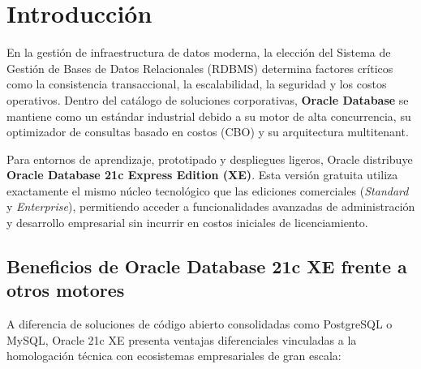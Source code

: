 \section{Introducción}
    
    En la gestión de infraestructura de datos moderna, la elección del Sistema de Gestión de Bases de Datos Relacionales (RDBMS) determina factores críticos como la consistencia transaccional, la escalabilidad, la seguridad y los costos operativos. Dentro del catálogo de soluciones corporativas, \textbf{Oracle Database} se mantiene como un estándar industrial debido a su motor de alta concurrencia, su optimizador de consultas basado en costos (CBO) y su arquitectura multitenant. 
    
    Para entornos de aprendizaje, prototipado y despliegues ligeros, Oracle distribuye \textbf{Oracle Database 21c Express Edition (XE)}. Esta versión gratuita utiliza exactamente el mismo núcleo tecnológico que las ediciones comerciales (\textit{Standard} y \textit{Enterprise}), permitiendo acceder a funcionalidades avanzadas de administración y desarrollo empresarial sin incurrir en costos iniciales de licenciamiento.
    
    \subsection{Beneficios de Oracle Database 21c XE frente a otros motores}
    
    A diferencia de soluciones de código abierto consolidadas como PostgreSQL o MySQL, Oracle 21c XE presenta ventajas diferenciales vinculadas a la homologación técnica con ecosistemas empresariales de gran escala:
    
